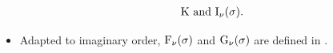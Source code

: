 \documentclass[9pt]{beamer}
\begin{document}
\begin{frame}
\begin{itemize}
\begin{align}
\begin{aligned}
\mathrm{K}\text{ and }{\mathrm{I}_{\nu}}\mathopen{}\left(\sigma\right)\mathclose{}.
\end{aligned}
\end{align}
\item Adapted to imaginary order, ${\mathrm{F}_{\nu}}\mathopen{}\left(\sigma\right)\mathclose{}$ and
${\mathrm{G}_{\nu}}\mathopen{}\left(\sigma\right)\mathclose{}$ are defined in .
\end{itemize}
\end{frame}
\end{document}
